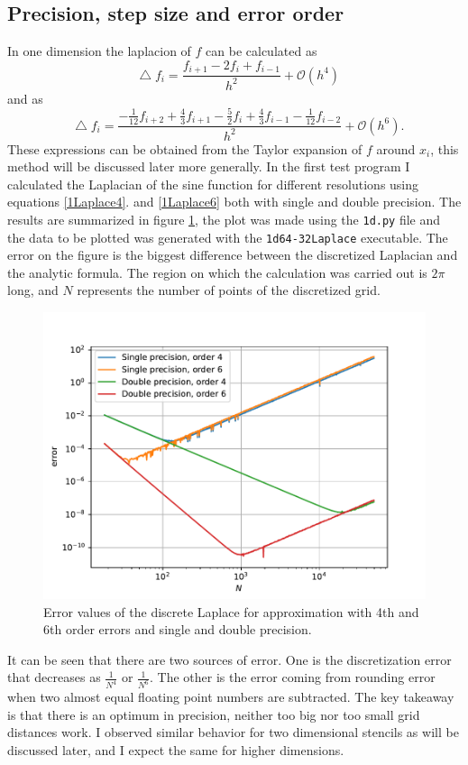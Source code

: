 \documentclass[pdftex,12pt,a4paper]{article}
\newcommand*\Laplace{\mathop{}\!\mathbin\bigtriangleup}
\begin{document}
	\subsection{Precision, step size and error order}
		\label{1dtest}
		In one dimension the laplacion of $f$ can be calculated as
		\begin{equation}
			\Laplace f_i = \frac{f_{i+1} - 2f_i + f_{i-1}}{h^2} + \mathcal{O}(h^4)
			\label{1Laplace4}
		\end{equation}
		and as
		\begin{equation}
			\Laplace f_i = \frac{-\frac{1}{12}f_{i+2} + \frac{4}{3}f_{i+1} - \frac{5}{2}f_i + \frac{4}{3}f_{i-1} - \frac{1}{12}f_{i-2}}{h^2} + \mathcal{O}(h^6).
			\label{1Laplace6}
		\end{equation}
		These expressions can be obtained from the Taylor expansion of $f$ around $x_i$, this method will be discussed later more generally. In the first test program I calculated the Laplacian of the sine function for different resolutions using equations \ref{1Laplace4}. and \ref{1Laplace6} both with single and double precision. The results are summarized in figure \ref{1dpdf}, the plot was made using the \texttt{1d.py} file and the data to be plotted was generated with the \texttt{1d64-32Laplace} executable. The error on the figure is the biggest difference between the discretized Laplacian and the analytic formula. The region on which the calculation was carried out is $2\pi$ long, and $N$ represents the number of points of the discretized grid.
		\begin{figure}[H]
			\centering
			\includegraphics[scale=1]{./figs/1d.pdf}
			\caption{Error values of the discrete Laplace for approximation with 4th and 6th order errors and single and double precision. }
			\label{1dpdf}
		\end{figure}
		It can be seen that there are two sources of error. One is the discretization error that decreases as $\frac{1}{N^4}$ or $\frac{1}{N^6}$. The other is the error coming from rounding error when two almost equal floating point numbers are subtracted. The key takeaway is that there is an optimum in precision, neither too big nor too small grid distances work. I observed similar behavior for two dimensional stencils as will be discussed later, and I expect the same for higher dimensions.
\end{document}
